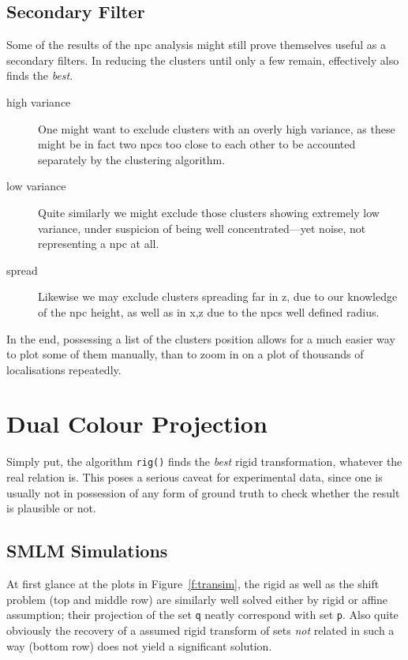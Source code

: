 \documentclass[11pt, a4paper, oneside, twocolumn]{report}
\renewcommand{\tt}{\texttt}
\newcommand{\e}{\emph}
\begin{document}
\subsection{Secondary Filter}

Some of the results of the \gls{npc} analysis might still prove
themselves useful as a secondary filters. In reducing the clusters
until only a few remain, effectively also finds the \e{best}.

\begin{description}
\item [high variance] One might want to exclude clusters with an
  overly high variance, as these might be in fact two \gls{npc}s too
  close to each other to be accounted separately by the clustering
  algorithm.
\item [low variance] Quite similarly we might exclude those clusters
  showing extremely low variance, under suspicion of being well
  concentrated---yet noise, not representing a \gls{npc} at all.
\item [spread] Likewise we may exclude clusters spreading far in z,
  due to our knowledge of the \gls{npc} height, as well as in x,z due
  to the \gls{npc}s well defined radius.
\end{description}

In the end, possessing a list of the clusters position allows for a
much easier way to plot some of them manually, than to zoom in on a
plot of thousands of localisations repeatedly.


\section{Dual Colour Projection}

Simply put, the algorithm \tt{rig()} finds the \e{best} rigid
transformation, whatever the real relation is. This poses a serious
caveat for experimental data, since one is usually not in possession
of any form of ground truth to check whether the result is plausible
or not.

\subsection{SMLM Simulations}\label{d:dcsim}

At first glance at the plots in Figure~\ref{f:transim}, the rigid as
well as the shift problem (top and middle row) are similarly well
solved either by rigid or affine assumption; their projection of the
set \tt{q} neatly correspond with set \tt{p}. Also quite obviously the
recovery of a assumed rigid transform of sets \e{not} related in such
a way (bottom row) does not yield a significant solution.\\
\end{document}
